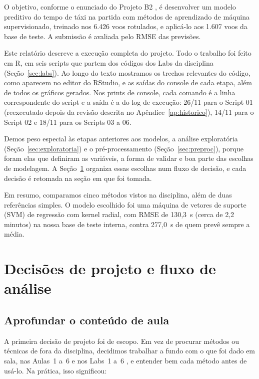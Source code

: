 \documentclass[12pt,a4paper]{article}
\begin{document}
O objetivo, conforme o enunciado do Projeto B2 \citep{enunciado}, é desenvolver um modelo preditivo do tempo de táxi na partida com métodos de aprendizado de máquina supervisionado, treinado nos 6.426 voos rotulados, e aplicá-lo aos 1.607 voos da base de teste. A submissão é avaliada pelo RMSE das previsões.

Este relatório descreve a execução completa do projeto. Todo o trabalho foi feito em R, em seis scripts que partem dos códigos dos Labs da disciplina (Seção~\ref{sec:labs}). Ao longo do texto mostramos os trechos relevantes do código, como aparecem no editor do RStudio, e as saídas do console de cada etapa, além de todos os gráficos gerados. Nos prints de console, cada comando é a linha correspondente do script e a saída é a do log de execução: 26/11 para o Script 01 (reexecutado depois da revisão descrita no Apêndice~\ref{ap:historico}), 14/11 para o Script 02 e 18/11 para os Scripts 03 a 06.

Demos peso especial às etapas anteriores aos modelos, a análise exploratória (Seção~\ref{sec:exploratoria}) e o pré-processamento (Seção~\ref{sec:preproc}), porque foram elas que definiram as variáveis, a forma de validar e boa parte das escolhas de modelagem. A Seção~\ref{sec:decisoes} organiza essas escolhas num fluxo de decisão, e cada decisão é retomada na seção em que foi tomada.

Em resumo, comparamos cinco métodos vistos na disciplina, além de duas referências simples. O modelo escolhido foi uma máquina de vetores de suporte (SVM) de regressão com kernel radial, com RMSE de 130,3~s (cerca de 2,2 minutos) na nossa base de teste interna, contra 277,0~s de quem prevê sempre a média.

\section{Decisões de projeto e fluxo de análise}\label{sec:decisoes}

\subsection{Aprofundar o conteúdo de aula}\label{sec:conteudo}

A primeira decisão de projeto foi de escopo. Em vez de procurar métodos ou técnicas de fora da disciplina, decidimos trabalhar a fundo com o que foi dado em sala, nas Aulas~1 a~6 e nos Labs~1 a~6 \citep{aulas}, e entender bem cada método antes de usá-lo. Na prática, isso significou:
\end{document}
